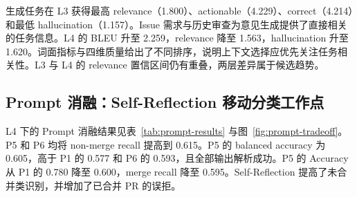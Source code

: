 \documentclass{experimentreport}
\begin{document}
{\begin{table}[H]
\centering
\caption{固定旧最优 Prompt 时的上下文阶梯结果。分类报告 balanced accuracy、Accuracy 及两类 Precision/Recall/F1；生成报告四维裁判分数，hallucination 越低越好。P/R/F1 三元组依次表示 Precision、Recall 和 F1。}
\label{tab:context-results}
\small
{}
\end{table}

生成任务在 L3 获得最高 relevance（1.800）、actionable（4.229）、correct（4.214）和最低 hallucination（1.157）。Issue 需求与历史审查为意见生成提供了直接相关的任务信息。L4 的 BLEU 升至 2.259，relevance 降至 1.563，hallucination 升至 1.620。词面指标与四维质量给出了不同排序，说明上下文选择应优先关注任务相关性。L3 与 L4 的 relevance 置信区间仍有重叠，两层差异属于候选趋势。

\subsection{Prompt 消融：Self-Reflection 移动分类工作点}

L4 下的 Prompt 消融结果见表~\ref{tab:prompt-results} 与图~\ref{fig:prompt-tradeoff}。P5 和 P6 均将 non-merge recall 提高到 0.615。P5 的 balanced accuracy 为 0.605，高于 P1 的 0.577 和 P6 的 0.593，且全部输出解析成功。P5 的 Accuracy 从 P1 的 0.780 降至 0.600，merge recall 降至 0.595。Self-Reflection 提高了未合并类识别，并增加了已合并 PR 的误拒。

}
\end{document}
